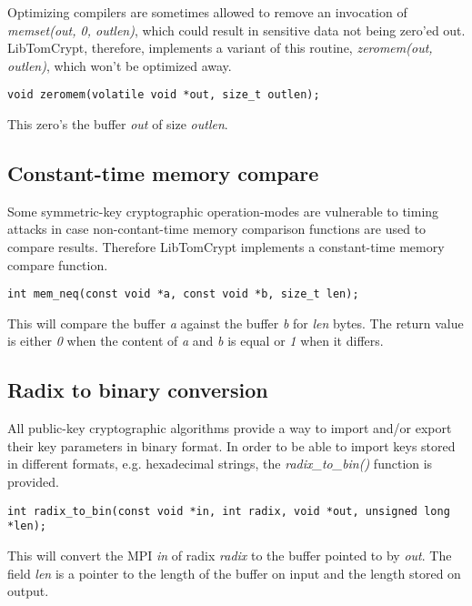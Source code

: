 \documentclass[synpaper]{book}
\begin{document}
Optimizing compilers are sometimes allowed to remove an invocation of \textit{memset(out, 0, outlen)},
which could result in sensitive data not being zero'ed out. LibTomCrypt, therefore, implements a variant
of this routine, \textit{zeromem(out, outlen)}, which won't be optimized away.

\begin{verbatim}
void zeromem(volatile void *out, size_t outlen);
\end{verbatim}

This zero's the buffer \textit{out} of size \textit{outlen}.

\subsection{Constant-time memory compare}

Some symmetric-key cryptographic operation-modes are vulnerable to timing attacks in case non-contant-time memory comparison functions
are used to compare results. Therefore LibTomCrypt implements a constant-time memory compare function.

\begin{verbatim}
int mem_neq(const void *a, const void *b, size_t len);
\end{verbatim}

This will compare the buffer \textit{a} against the buffer \textit{b} for \textit{len} bytes.
The return value is either \textit{0} when the content of \textit{a} and \textit{b} is equal or \textit{1} when it differs.

\subsection{Radix to binary conversion}

All public-key cryptographic algorithms provide a way to import and/or export their key parameters in binary format.
In order to be able to import keys stored in different formats, e.g. hexadecimal strings, the \textit{radix\_to\_bin()} function is provided.

\begin{verbatim}
int radix_to_bin(const void *in, int radix, void *out, unsigned long *len);
\end{verbatim}

This will convert the MPI \textit{in} of radix \textit{radix} to the buffer pointed to by \textit{out}.
The field \textit{len} is a pointer to the length of the buffer on input and the length stored on output.
\end{document}
